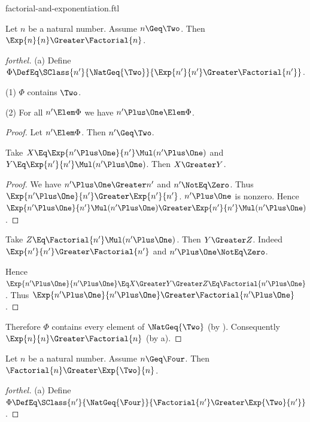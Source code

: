 \documentclass{stex}
\begin{document}
\begin{smodule}{factorial-and-exponentiation.ftl}


\begin{proposition*}[forthel]
  Let $n$ be a natural number.
  Assume $n \Geq \Two$.
  Then $\Exp{n}{n} \Greater \Factorial{n}$.
\end{proposition*}
\begin{proof}[forthel]
  (a) Define $\Phi \DefEq \SClass{n'}{\NatGeq{\Two}}{\Exp{n'}{n'} \Greater \Factorial{n'}}$.

  (1) $\Phi$ contains $\Two$.

  (2) For all $n' \Elem \Phi$ we have $n' \Plus \One \Elem \Phi$.
  \begin{proof}
    Let $n' \Elem \Phi$.
    Then $n' \Geq \Two$.

    Take $X \Eq \Exp{n' \Plus \One}{n'} \Mul (n' \Plus \One)$ and $Y \Eq \Exp{n'}{n'} \Mul (n' \Plus \One)$.
    Then $X \Greater Y$.
    \begin{proof}
      We have $n' \Plus \One \Greater n'$ and $n' \NotEq \Zero$.
      Thus $\Exp{n' \Plus \One}{n'} \Greater \Exp{n'}{n'}$.
      $n' \Plus \One$ is nonzero.
      Hence $\Exp{n' \Plus \One}{n'} \Mul (n' \Plus \One) \Greater \Exp{n'}{n'} \Mul (n' \Plus \One)$.
    \end{proof}

    Take $Z \Eq \Factorial{n'} \Mul (n' \Plus \One)$.
    Then $Y \Greater Z$.
    Indeed $\Exp{n'}{n'} \Greater \Factorial{n'}$ and $n' \Plus \One \NotEq \Zero$.

    Hence $\Exp{n' \Plus \One}{n' \Plus \One} \Eq X \Greater Y \Greater Z \Eq \Factorial{n' \Plus \One}$.
    Thus $\Exp{n' \Plus \One}{n' \Plus \One} \Greater \Factorial{n' \Plus \One}$.
  \end{proof}

  Therefore $\Phi$ contains every element of $\NatGeq{\Two}$ (by ).
  Consequently $\Exp{n}{n} \Greater \Factorial{n}$ (by a).
\end{proof}

\begin{proposition*}[forthel]
  Let $n$ be a natural number.
  Assume $n \Geq \Four$.
  Then $\Factorial{n} \Greater \Exp{\Two}{n}$.
\end{proposition*}
\begin{proof}[forthel]
  (a) Define $\Phi \DefEq \SClass{n'}{\NatGeq{\Four}}{\Factorial{n'} \Greater \Exp{\Two}{n'}}$.


\end{proof}
\end{smodule}
\end{document}
